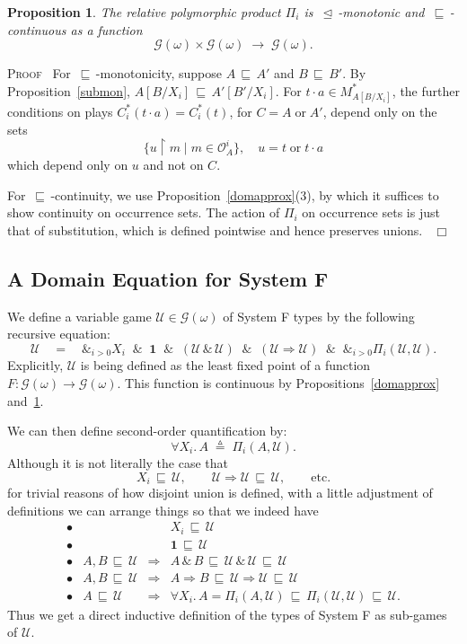 \documentclass[a4paper,11pt]{article}
\newcommand{\eqdef}{\stackrel{\vartriangle}{=}}
\newcommand{\UU}{\mathcal{U}}
\newtheorem{proposition}{Proposition}[section]
\newcommand{\GG}[1]{\mathcal{G}(#1)}
\newcommand{\restrict}{{\upharpoonright}}
\newcommand{\llwith}{\, \& \,}
\newcommand{\domapprox}{\, \sqsubseteq \,}
\newcommand{\ginc}{\, \trianglelefteq \,}
\newcommand{\Occ}{\mathcal{O}}
\newenvironment{proof}{\textsc{Proof}\ }{$\;\; \Box$}
\begin{document}
\begin{proposition}
\label{prodcont}
The relative polymorphic product $\Pi_{i}$ is
$\ginc$-monotonic and $\domapprox$-continuous as a function
\[ \GG{\omega} \times \GG{\omega} \; \longrightarrow \; \GG{\omega} . \]
\end{proposition}
\begin{proof}
For $\domapprox$-monotonicity, suppose $A \domapprox A'$ and $B \domapprox B'$. By Proposition~\ref{submon}, $A[B/X_{i}] \domapprox A'[B'/X_{i}]$. For $t \cdot a \in M_{A[B/X_{i}]}^{\ast}$, the further conditions on plays $C^{\ast}_i (t \cdot a) = C^{\ast}_i (t)$, for $C = A \; \mbox{or} \; A'$, depend only on the sets
\[ \{ u \restrict m \mid m \in \Occ_A^i \} , \quad u = t \; \mbox{or} \; t \cdot a \]
which depend only on $u$ and not on $C$.

For $\domapprox$-continuity, we use Proposition~\ref{domapprox}(3), by
which it suffices to show continuity on occurrence sets. The action of
$\Pi_i$ on occurrence sets is just that of substitution, which is defined
pointwise and hence preserves unions.
\end{proof}

\subsection{A Domain Equation for System F}

We define a variable game $\UU \in \GG{\omega}$ of System F types by the following
recursive equation:
\[ \UU \quad = \quad \&_{i>0} X_i \;\; \& \;\; \mathbf{1} \;\; \& \;\; (\UU \llwith \UU ) \;\; \& \;\; (\UU \Rightarrow \UU ) \;\; \& \;\; \&_{i>0}
\Pi_{i} (\UU , \UU ) . \]
Explicitly, $\UU$ is being defined as the least fixed point of a function $F : \GG{\omega} \longrightarrow \GG{\omega}$. This function is continuous by Propositions~\ref{domapprox} and~\ref{prodcont}.

We can then define second-order quantification by:
\[ \forall X_i . \, A \; \eqdef \; \Pi_{i} (A, \UU ) . \]
Although it is not literally the case that
\[ X_i \domapprox \UU, \qquad \UU \Rightarrow \UU \domapprox
\UU , \qquad \mbox{etc.} \]
for trivial reasons of how disjoint union is defined, with a
little adjustment of definitions we can arrange things so that we
indeed have
\[ \begin{array}{llcc}
\bullet & & & X_i \domapprox \UU   \\
\bullet & & & \mathbf{1} \domapprox \UU   \\
\bullet & A, B \domapprox \UU &
\Longrightarrow & A \llwith B \domapprox \UU \llwith \UU
\domapprox \UU \\
\bullet & A, B \domapprox \UU &
\Longrightarrow & A \Rightarrow B \domapprox \UU \Rightarrow \UU
\domapprox \UU \\
\bullet & A \domapprox \UU & \Longrightarrow & \forall X_i . \, A = \Pi_{i}(A,
\UU ) \domapprox \Pi_{i}(\UU ,
\UU ) \domapprox \UU .
\end{array} \]
Thus we get a direct inductive definition of the types of System F as
sub-games of $\UU$.
\end{document}
